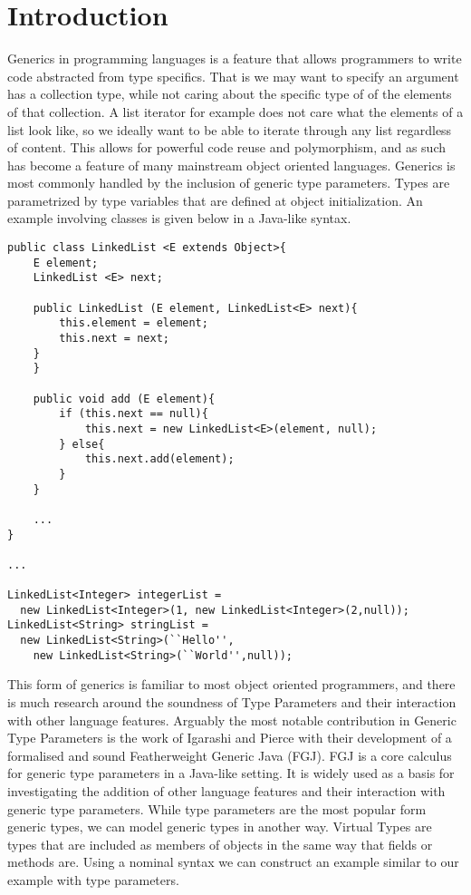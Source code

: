 \documentclass[11pt
              , a4paper
              , twoside
              , openright
              ]{report}
\begin{document}
\chapter{Introduction}\label{ch:intro}
Generics in  programming languages is a feature that allows programmers to write code abstracted from type specifics. That is we may want to specify an argument has a collection type, while not caring about the specific type of of the elements of that collection. A list iterator for example does not care what the elements of a list look like, so we ideally want to be able to iterate through any list regardless of content. This allows for powerful code reuse and polymorphism, and as such has become a feature of many mainstream object oriented languages. 
Generics is most commonly handled by the inclusion of generic type parameters. Types are parametrized by type variables that are defined at object initialization. An example involving classes is given below in a Java-like syntax.
\begin{lstlisting}[mathescape, style=custom_lang]
public class LinkedList <E extends Object>{
	E element;
	LinkedList <E> next;
	
	public LinkedList (E element, LinkedList<E> next){
		this.element = element;
		this.next = next;
	}
	}
	
	public void add (E element){
		if (this.next == null){
			this.next = new LinkedList<E>(element, null);
		} else{
			this.next.add(element);
		}
	}
	
	...
}

...

LinkedList<Integer> integerList = 
  new LinkedList<Integer>(1, new LinkedList<Integer>(2,null));
LinkedList<String> stringList = 
  new LinkedList<String>(``Hello'', 
    new LinkedList<String>(``World'',null));
\end{lstlisting}
This form of generics is familiar to most object oriented programmers, and there is much research around the soundness of Type Parameters and their interaction with other language features. Arguably the most notable contribution in Generic Type Parameters is the work of Igarashi and Pierce \cite{FGJ stuff} with their development of a formalised and sound Featherweight Generic Java (FGJ). FGJ is a core calculus for generic type parameters in a Java-like setting. It is widely used as a basis for investigating the addition of other language features and their interaction with generic type parameters. While type parameters are the most popular form generic types, we can model generic types in another way. Virtual Types are types that are included as members of objects in the same way that fields or methods are. Using a nominal syntax we can construct an example similar to our example with type parameters.
\end{document}
